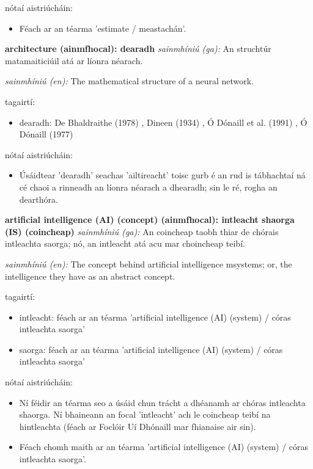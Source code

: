 \documentclass{article}
\begin{document}
nótaí aistriúcháin:
\begin{itemize}
	\item Féach ar an téarma 'estimate / meastachán'.
\end{itemize}


\textbf{architecture (ainmfhocal): dearadh}
\textit{sainmhíniú (ga):} An struchtúr matamaiticiúil atá ar líonra néarach.

\textit{sainmhíniú (en):} The mathematical structure of a neural network.

tagairtí:
\begin{itemize}
	\item dearadh: De Bhaldraithe (1978) \cite{de-bhaldraithe}, Dineen (1934) \cite{dineen}, Ó Dónaill et al. (1991) \cite{focloir-beag}, Ó Dónaill (1977) \cite{odonaill}
\end{itemize}

nótaí aistriúcháin:
\begin{itemize}
	\item Úsáidtear 'dearadh' seachas 'ailtireacht' toisc gurb é an rud is tábhachtaí ná cé chaoi a rinneadh an líonra néarach a dhearadh; sin le ré, rogha an dearthóra.
\end{itemize}


\textbf{artificial intelligence (AI) (concept) (ainmfhocal): intleacht shaorga (IS) (coincheap)}
\textit{sainmhíniú (ga):} An coincheap taobh thiar de chórais intleachta saorga; nó, an intleacht atá acu mar choincheap teibí.

\textit{sainmhíniú (en):} The concept behind artificial intelligence msystems; or, the intelligence they have as an abstract concept.

tagairtí:
\begin{itemize}
	\item intleacht: féach ar an téarma 'artificial intelligence (AI) (system) / córas intleachta saorga'
	\item saorga: féach ar an téarma 'artificial intelligence (AI) (system) / córas intleachta saorga'
\end{itemize}

nótaí aistriúcháin:
\begin{itemize}
	\item Ní féidir an téarma seo a úsáid chun trácht a dhéanamh ar chóras intleachta shaorga. Ní bhaineann an focal 'intleacht' ach le coincheap teibí na hintleachta (féach ar Foclóir Uí Dhónaill mar fhianaise air sin).
	\item Féach chomh maith ar an téarma 'artificial intelligence (AI) (system) / córas intleachta saorga'.
\end{itemize}
\end{document}
